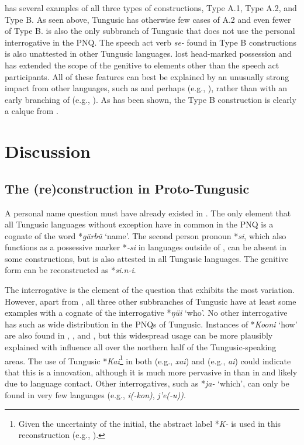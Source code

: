 \documentclass[output=paper,colorlinks,citecolor=brown]{langscibook}
\begin{document}
 has several examples of all three types of constructions, Type A.1, Type A.2, and Type B. As seen above, Tungusic has otherwise few cases of A.2 and even fewer of Type B.  is also the only subbranch of Tungusic that does not use the personal interrogative in the PNQ. The speech act verb \textit{se-} found in Type B constructions is also unattested in other Tungusic languages.  lost head-marked possession and has extended the scope of the genitive to elements other than the speech act participants. All of these features can best be explained by an unusually strong impact from other languages, such as  and perhaps  (e.g., \citealt{Vovin2006}), rather than with an early branching of  (e.g., \citealt{Kazama2003}). As has been shown, the  Type B construction is clearly a calque from .


\section{Discussion}\label{section4.5}

\subsection{The (re)construction in Proto-Tungusic}\label{section4.5.1}

A personal name question must have already existed in . The only element that all Tungusic languages without exception have in common in the PNQ is a cognate of the word *\textit{gärbü} ‘name’. The second person pronoun *\textit{si}, which also functions as a possessive marker *\textit{-si} in languages outside of , can be absent in some constructions, but is also attested in all Tungusic languages. The genitive form can be reconstructed as *\textit{si.n-i}.

The interrogative is the element of the question that exhibits the most variation. However, apart from , all three other subbranches of Tungusic have at least some examples with a cognate of the interrogative *\textit{ŋüi} ‘who’. No other interrogative has such as wide distribution in the PNQs of Tungusic. Instances of *\textit{Kooni} ‘how’ are also found in , , and , but this widespread usage can be more plausibly explained with  influence all over the northern half of the Tungusic-speaking areas. The use of Tungusic *\textit{Kai}\footnote{Given the uncertainty of the initial, the abstract label *\textit{K-} is used in this reconstruction (e.g., \citealt{Hölzlpreprint}).} in both  (e.g.,  \textit{xai}) and  (e.g.,  \textit{ai}) could indicate that this is a  innovation, although it is much more pervasive in  than in  and likely due to language contact. Other interrogatives, such as *\textit{ja-} ‘which’, can only be found in very few languages (e.g.,  \textit{i(-kon)},  \textit{j’e(-u))}.
\end{document}
